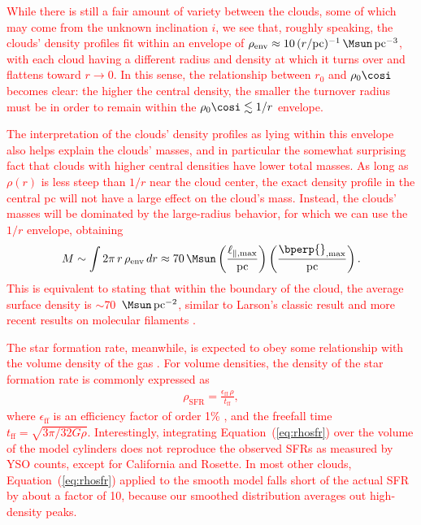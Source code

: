 \documentclass[twocolumn]{aastex631}
\begin{document}
{\textcolor{red}{While there is still a fair amount of variety between the clouds, some of which may come from the unknown inclination $i$, we see that, roughly speaking, the clouds'
density profiles fit within an envelope of
$\rho_{\mathrm{env}} \approx 10\,(r/\mathrm{pc})^{-1}\,\Msun\,\mathrm{pc}^{-3}$,
with each cloud having a different radius and density at which it turns over and
flattens toward $r \to 0$. In this sense, the relationship between $r_0$ and
$\rho_0\cosi$ becomes clear: the higher the central density, the smaller the
turnover radius must be in order to remain within the $\rho_0\cosi \lesssim 1/r$
envelope.}



\textcolor{red}{The interpretation of the clouds' density profiles as lying within this envelope
also helps explain the clouds' masses, and in particular the somewhat surprising
fact that clouds with higher central densities have lower total masses. As long as
$\rho(r)$ is less steep than $1/r$ near the cloud center, the exact density profile
in the central pc will not have a large effect on the cloud's mass. Instead, the
clouds' masses will be dominated by the large-radius behavior, for which we can use
the $1/r$ envelope, obtaining
\begin{align}\label{eq:massenv}
M \sim \int 2\pi\, r\, \rho_{\mathrm{env}}\, dr
\approx 70\, \Msun \left(\frac{\ell_{\parallel,\mathrm{max}}}{\mathrm{pc}}\right)
\left(\frac{\bperp{}_{,\mathrm{max}}}{\mathrm{pc}}\right).
\end{align}
This is equivalent to stating that within the boundary of the cloud, the average
surface density is $\sim$70~$\Msun\,\mathrm{pc}^{-2}$, similar to Larson's classic
result \citep{Larson1981} and more recent results on molecular filaments
\citep{Zhang2019}.}

\textcolor{red}{The star formation rate, meanwhile, is expected to obey some relationship with the
volume density of the gas \citep{Schmidt1959, Kennicutt2012}. For volume
densities, the density of the star formation rate is commonly expressed as
\begin{align}\label{eq:rhosfr}
\rho_{\mathrm{SFR}} = \frac{\epsilon_{\mathrm{ff}}\, \rho}{t_{\mathrm{ff}}},
\end{align}
where $\epsilon_{\mathrm{ff}}$ is an efficiency factor of order 1\%
\citep[e.g.,][]{Krumholz2007, Krumholz2012}, and the freefall time
$t_{\mathrm{ff}} = \sqrt{3\pi/32 G \rho}$. Interestingly, integrating
Equation~(\ref{eq:rhosfr}) over the volume of the model cylinders does not
reproduce the observed SFRs as measured by YSO counts, except for California and
Rosette. In most other clouds, Equation~(\ref{eq:rhosfr}) applied to the smooth
model falls short of the actual SFR by about a factor of 10, because our smoothed
distribution averages out high-density peaks.}

}
\end{document}
